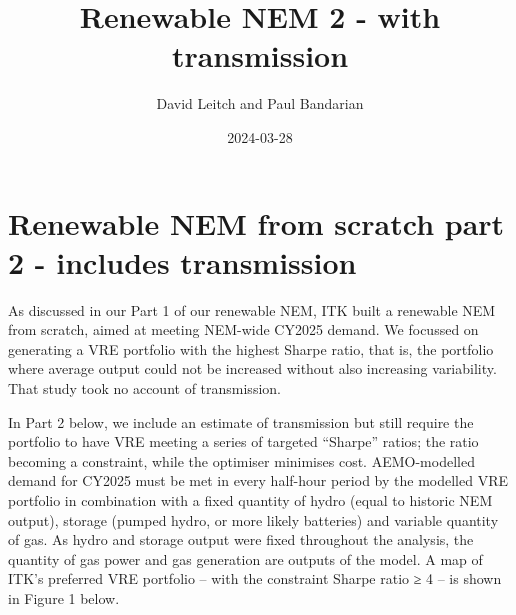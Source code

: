 \documentclass[
  letterpaper,
  DIV=11,
  numbers=noendperiod]{scrartcl}
\title{Renewable NEM 2 - with transmission}
\author{David Leitch and Paul Bandarian}
\date{2024-03-28}
\begin{document}
\maketitle

\section{Renewable NEM from scratch part 2 - includes
transmission}\label{renewable-nem-from-scratch-part-2---includes-transmission}

As discussed in our Part 1 of our renewable NEM, ITK built a renewable
NEM from scratch, aimed at meeting NEM-wide CY2025 demand. We focussed
on generating a VRE portfolio with the highest Sharpe ratio, that is,
the portfolio where average output could not be increased without also
increasing variability. That study took no account of transmission.

In Part 2 below, we include an estimate of transmission but still
require the portfolio to have VRE meeting a series of targeted
``Sharpe'' ratios; the ratio becoming a constraint, while the optimiser
minimises cost. AEMO-modelled demand for CY2025 must be met in every
half-hour period by the modelled VRE portfolio in combination with a
fixed quantity of hydro (equal to historic NEM output), storage (pumped
hydro, or more likely batteries) and variable quantity of gas. As hydro
and storage output were fixed throughout the analysis, the quantity of
gas power and gas generation are outputs of the model. A map of ITK's
preferred VRE portfolio -- with the constraint Sharpe ratio ≥ 4 -- is
shown in Figure 1 below.
\end{document}

